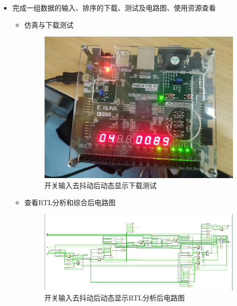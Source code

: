 \documentclass[UTF8,fontset=fandol]{ctexart}
\begin{document}
\begin{itemize}
\item 完成一组数据的输入、排序的下载、测试及电路图、使用资源查看
\begin{itemize}
  \item 仿真与下载测试
   \begin{figure}[H]
     \centering
     \includegraphics[scale=0.2]{微信图片_20211125140157.jpg}
     \caption{开关输入去抖动后动态显示下载测试}
 \end{figure}
 \item 查看RTL分析和综合后电路图
 \begin{figure}[H]
   \centering
   \includegraphics[scale=0.5]{Snipaste_2021-11-25_14-00-32.png}
   \caption{开关输入去抖动后动态显示RTL分析后电路图}
 \end{figure}
 \begin{figure}[H]
   \centering

\end{figure}
\end{itemize}
\end{itemize}
\end{document}
